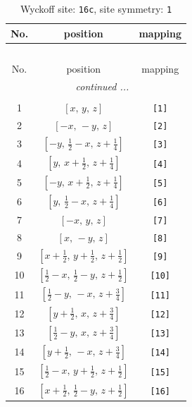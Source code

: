 \documentclass[fleqn,8pt]{jsarticle}
\begin{document}
\begin{longtable}{ccc}
\caption{Wyckoff site: {\tt 16c}, site symmetry: {\tt 1}}
 \\
 \hline \hline
No. & position & mapping \\ \hline \endfirsthead

\multicolumn{2}{l}{\tablename\ \thetable{}} \\
 \hline \hline
No. & position & mapping \\ \hline \endhead

 \hline \hline
\multicolumn{2}{r}{\footnotesize\it continued ...} \\ \endfoot

 \hline \hline
\multicolumn{2}{r}{} \\ \endlastfoot

1 & $\left[ x,\, y,\, z \right]$ & {\tt [1]} \\ \hline
2 & $\left[ - x,\, - y,\, z \right]$ & {\tt [2]} \\ \hline
3 & $\left[ - y,\, \frac{1}{2} - x,\, z + \frac{1}{4} \right]$ & {\tt [3]} \\ \hline
4 & $\left[ y,\, x + \frac{1}{2},\, z + \frac{1}{4} \right]$ & {\tt [4]} \\ \hline
5 & $\left[ - y,\, x + \frac{1}{2},\, z + \frac{1}{4} \right]$ & {\tt [5]} \\ \hline
6 & $\left[ y,\, \frac{1}{2} - x,\, z + \frac{1}{4} \right]$ & {\tt [6]} \\ \hline
7 & $\left[ - x,\, y,\, z \right]$ & {\tt [7]} \\ \hline
8 & $\left[ x,\, - y,\, z \right]$ & {\tt [8]} \\ \hline
9 & $\left[ x + \frac{1}{2},\, y + \frac{1}{2},\, z + \frac{1}{2} \right]$ & {\tt [9]} \\ \hline
10 & $\left[ \frac{1}{2} - x,\, \frac{1}{2} - y,\, z + \frac{1}{2} \right]$ & {\tt [10]} \\ \hline
11 & $\left[ \frac{1}{2} - y,\, - x,\, z + \frac{3}{4} \right]$ & {\tt [11]} \\ \hline
12 & $\left[ y + \frac{1}{2},\, x,\, z + \frac{3}{4} \right]$ & {\tt [12]} \\ \hline
13 & $\left[ \frac{1}{2} - y,\, x,\, z + \frac{3}{4} \right]$ & {\tt [13]} \\ \hline
14 & $\left[ y + \frac{1}{2},\, - x,\, z + \frac{3}{4} \right]$ & {\tt [14]} \\ \hline
15 & $\left[ \frac{1}{2} - x,\, y + \frac{1}{2},\, z + \frac{1}{2} \right]$ & {\tt [15]} \\ \hline
16 & $\left[ x + \frac{1}{2},\, \frac{1}{2} - y,\, z + \frac{1}{2} \right]$ & {\tt [16]} \\
\end{longtable}
\end{document}
